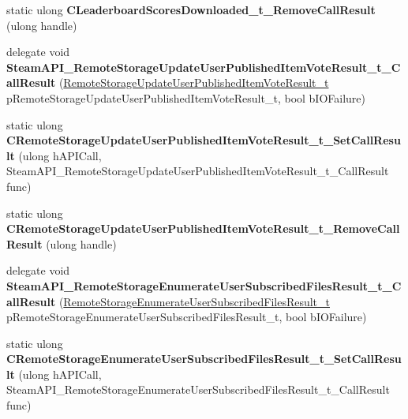 \begin{DoxyCompactItemize}
static ulong {\bfseries C\+Leaderboard\+Scores\+Downloaded\+\_\+t\+\_\+\+Remove\+Call\+Result} (ulong handle)
\item 
\mbox{\label{class_valve_1_1_interop_1_1_native_entrypoints_a4c1ba9ef1391b5c4efd3422efe715b1d}} 
delegate void {\bfseries Steam\+A\+P\+I\+\_\+\+Remote\+Storage\+Update\+User\+Published\+Item\+Vote\+Result\+\_\+t\+\_\+\+Call\+Result} (\hyperlink{struct_valve_1_1_steamworks_1_1_remote_storage_update_user_published_item_vote_result__t}{Remote\+Storage\+Update\+User\+Published\+Item\+Vote\+Result\+\_\+t} p\+Remote\+Storage\+Update\+User\+Published\+Item\+Vote\+Result\+\_\+t, bool b\+I\+O\+Failure)
\item 
\mbox{\label{class_valve_1_1_interop_1_1_native_entrypoints_a37eca16a91ecf7ef110a31b0984a2534}} 
static ulong {\bfseries C\+Remote\+Storage\+Update\+User\+Published\+Item\+Vote\+Result\+\_\+t\+\_\+\+Set\+Call\+Result} (ulong h\+A\+P\+I\+Call, Steam\+A\+P\+I\+\_\+\+Remote\+Storage\+Update\+User\+Published\+Item\+Vote\+Result\+\_\+t\+\_\+\+Call\+Result func)
\item 
\mbox{\label{class_valve_1_1_interop_1_1_native_entrypoints_a01653c8b3ca3bd166564084f0b97315f}} 
static ulong {\bfseries C\+Remote\+Storage\+Update\+User\+Published\+Item\+Vote\+Result\+\_\+t\+\_\+\+Remove\+Call\+Result} (ulong handle)
\item 
\mbox{\label{class_valve_1_1_interop_1_1_native_entrypoints_aa2f023252a8001f75575a47e47df6f75}} 
delegate void {\bfseries Steam\+A\+P\+I\+\_\+\+Remote\+Storage\+Enumerate\+User\+Subscribed\+Files\+Result\+\_\+t\+\_\+\+Call\+Result} (\hyperlink{struct_valve_1_1_steamworks_1_1_remote_storage_enumerate_user_subscribed_files_result__t}{Remote\+Storage\+Enumerate\+User\+Subscribed\+Files\+Result\+\_\+t} p\+Remote\+Storage\+Enumerate\+User\+Subscribed\+Files\+Result\+\_\+t, bool b\+I\+O\+Failure)
\item 
\mbox{\label{class_valve_1_1_interop_1_1_native_entrypoints_a6d856db0c34b2e1c23f1d495f1e14758}} 
static ulong {\bfseries C\+Remote\+Storage\+Enumerate\+User\+Subscribed\+Files\+Result\+\_\+t\+\_\+\+Set\+Call\+Result} (ulong h\+A\+P\+I\+Call, Steam\+A\+P\+I\+\_\+\+Remote\+Storage\+Enumerate\+User\+Subscribed\+Files\+Result\+\_\+t\+\_\+\+Call\+Result func)

\end{DoxyCompactItemize}
